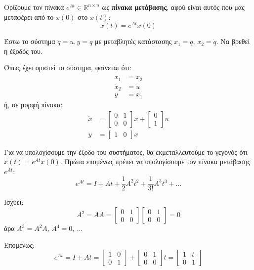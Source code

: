 \documentclass[11pt,a4paper,notitlepage,fleqn]{article}
\begin{document}
Ορίζουμε τον πίνακα \( e^{At} \in \mathbb R^{n\times n} \) ως
\textbf{πίνακα μετάβασης}, αφού είναι αυτός που μας μεταφέρει από
το \( x(0) \) στο \( x(t) \):
\[
x(t) = e^{At} x(0)
\]

\begin{exercise}[Παράδειγμα]
	Έστω το σύστημα \( \ddot q = u, y=q \) με μεταβλητές κατάστασης
	\( x_1=q \), \( x_2 = \dot q \). Να βρεθεί η έξοδός του.
	\tcblower

	Όπως έχει οριστεί το σύστημα, φαίνεται ότι:
	\begin{align*}
		\dot x_1 &= x_2\\
		\dot x_2 &= u\\
		y &= x_1
	\end{align*}
	ή, σε μορφή πίνακα:
	\begin{align*}
		\dot x &= \left[\begin{matrix}
		0 & 1 \\ 0 & 0
		\end{matrix}\right]x + \left[\begin{matrix}
		0 \\ 1
		\end{matrix}\right]u\\
		y &= \left[\begin{matrix}
		1 & 0
		\end{matrix}\right] x
	\end{align*}

	Για να υπολογίσουμε την έξοδο του συστήματος, θα εκμεταλλευτούμε το γεγονός ότι
	\( x(t) = e^{At} x(0) \). Πρώτα επομένως πρέπει να υπολογίσουμε τον πίνακα μετάβασης
	\( e^{At} \):
	\[
	e^{At} = I + At + \frac{1}{2} A^2t^2 + \frac{1}{3!} A^3t^3 + \dots
	\]

	Ισχύει:
	\[
	A^2 = AA = \left[\begin{matrix}
	0 & 1 \\ 0 & 0
	\end{matrix}\right]\left[\begin{matrix}
	0 & 1 \\ 0 & 0
	\end{matrix}\right] = 0
	\]
	άρα \( A^3 = A^2 A \), \( A^4 = 0,\ \dots \)

	Επομένως:
	\[
	e^{At} = I + At = \left[\begin{matrix}
	1 & 0 \\ 0 & 1
	\end{matrix}\right] + \left[\begin{matrix}
	0 & 1 \\ 0 & 0
	\end{matrix}\right] t = \left[\begin{matrix}
	1 & t \\ 0 & 1
	\end{matrix}\right]
	\]


\end{exercise}
\end{document}
